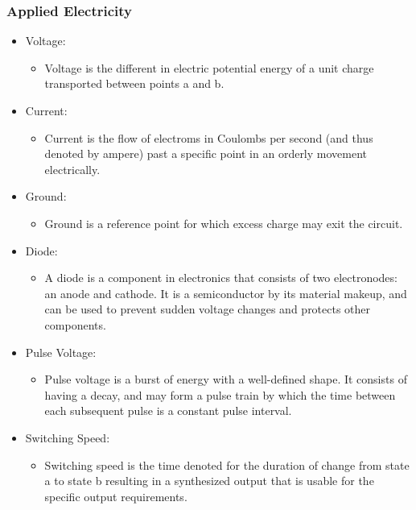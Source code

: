 \documentclass[12pt]{article}
\begin{document}
\subsubsection{Applied Electricity}
\begin{itemize}
\item Voltage:
\begin{itemize}
\item Voltage is the different in electric potential energy of a unit charge transported between points a and b.
\end{itemize}
\item Current:
\begin{itemize}
\item Current is the flow of electroms in Coulombs per second (and thus denoted by ampere) past a specific point in an orderly movement electrically.
\end{itemize}
\item Ground:
\begin{itemize}
\item Ground is a reference point for which excess charge may exit the circuit.
\end{itemize}
\item Diode:
\begin{itemize}
\item A diode is a component in electronics that consists of two electronodes: an anode and cathode. It is a semiconductor by its material makeup, and can be used to prevent sudden voltage changes and protects other components.
\end{itemize}
\item Pulse Voltage:
\begin{itemize}
\item Pulse voltage is a burst of energy with a well-defined shape. It consists of having a decay, and may form a pulse train by which the time between each subsequent pulse is a constant pulse interval.
\end{itemize}
\item Switching Speed:
\begin{itemize}
\item Switching speed is the time denoted for the duration of change from state a to state b resulting in a synthesized output that is usable for the specific output requirements.
\end{itemize}
\end{itemize}
\end{document}
